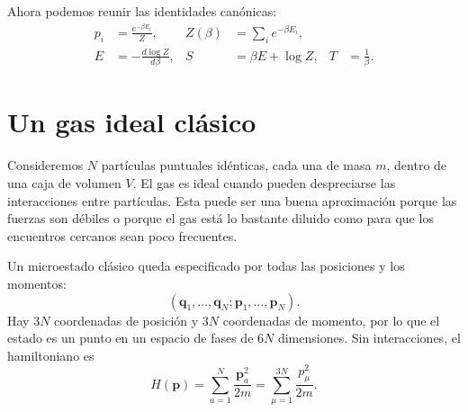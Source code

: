 \begin{classroomqa}\end{classroomqa}

Ahora podemos reunir las identidades canónicas:
\begin{align}
 p_i&=\frac{e^{-\beta E_i}}{Z},&
 Z(\beta)&=\sum_i e^{-\beta E_i},\label{eq:sm4-canonical-pair}\\
 E&=-\frac{d\log Z}{d\beta},&
 S&=\beta E+\log Z,&
 T&=\frac{1}{\beta}.
 \label{eq:sm4-canonical-identities}
\end{align}

\section{Un gas ideal clásico}

Consideremos \(N\) partículas puntuales idénticas, cada una de masa \(m\), dentro de una caja de volumen \(V\). El gas es ideal cuando pueden despreciarse las interacciones entre partículas. Esta puede ser una buena aproximación porque las fuerzas son débiles o porque el gas está lo bastante diluido como para que los encuentros cercanos sean poco frecuentes.

Un microestado clásico queda especificado por todas las posiciones y los momentos:
\begin{equation}
 (\bm q_1,\ldots,\bm q_N;\bm p_1,\ldots,\bm p_N).
\end{equation}
Hay \(3N\) coordenadas de posición y \(3N\) coordenadas de momento, por lo que el estado es un punto en un espacio de fases de \(6N\) dimensiones. Sin interacciones, el hamiltoniano es
\begin{equation}
 H(\bm p)=\sum_{a=1}^{N}\frac{\bm p_a^2}{2m}
 =\sum_{\mu=1}^{3N}\frac{p_\mu^2}{2m}.
 \label{eq:sm4-ideal-hamiltonian}
\end{equation}

\begin{classroomqa}\end{classroomqa}

